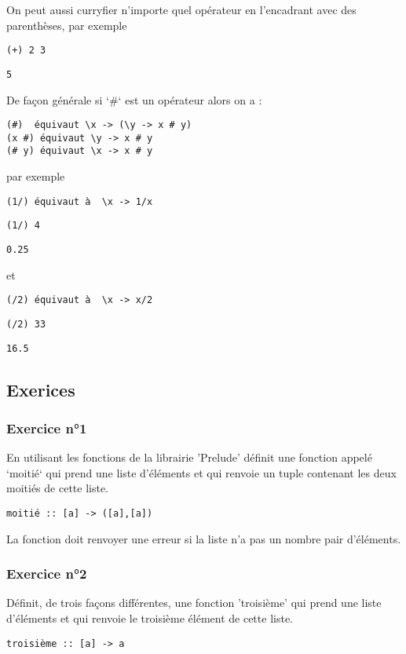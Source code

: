 \documentclass[11pt]{article}
\begin{document}
On peut aussi curryfier n'importe quel opérateur en  l'encadrant avec des parenthèses, par exemple
\begin{verbatim}
(+) 2 3
\end{verbatim}
\begin{verbatim}
5
\end{verbatim}


De façon générale si `\#` est un opérateur alors on a :
\begin{verbatim}
(#)  équivaut \x -> (\y -> x # y)
(x #) équivaut \y -> x # y
(# y) équivaut \x -> x # y
\end{verbatim}


par exemple 
\begin{verbatim}
(1/) équivaut à  \x -> 1/x
\end{verbatim}

\begin{verbatim}
(1/) 4
\end{verbatim}
\begin{verbatim}
0.25
\end{verbatim}


et 
\begin{verbatim}
(/2) équivaut à  \x -> x/2
\end{verbatim}

\begin{verbatim}
(/2) 33
\end{verbatim}
\begin{verbatim}
16.5
\end{verbatim}

\subsection{Exerices}
\label{sec:orgd34a7f8}

\subsubsection{Exercice n°1}
\label{sec:orgd427cfa}
En utilisant les fonctions de la librairie 'Prelude' définit une fonction appelé `moitié` qui prend une liste d'éléments et qui renvoie un tuple contenant les deux moitiés de cette liste.
\begin{verbatim}
moitié :: [a] -> ([a],[a])
\end{verbatim}

La fonction doit renvoyer une erreur si la liste n'a pas un nombre pair d'éléments.

\subsubsection{Exercice n°2}
\label{sec:orgc6435ab}
Définit, de trois façons différentes, une fonction 'troisième' qui prend une liste d'éléments et qui renvoie le troisième élément de cette liste.
\begin{verbatim}
troisième :: [a] -> a
\end{verbatim}
\end{document}
